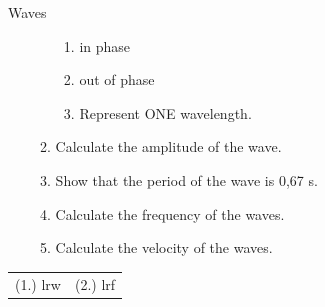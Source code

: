 \begin{eocexercises}{Waves}
\begin{enumerate}[noitemsep, label=\textbf{\arabic*}. ]
\begin{enumerate}[noitemsep, label=\textbf{\alph*}. ]
\label{m38806*uid0821323}\begin{enumerate}[noitemsep, label=\textbf{\roman*}. ] 
            \item in phase\item out of phase\item Represent ONE wavelength.\end{enumerate}
        \item Calculate the amplitude of the wave.\item Show that the period of the wave is 0,67 s.\item Calculate the frequency of the waves.\item Calculate the velocity of the waves.\end{enumerate}
         \end{enumerate}
  \label{m38806**end}
\par \practiceinfo
 \par \begin{tabular}[h]{cc}
(1.) lrw  &  (2.) lrf  & \end{tabular}

\end{eocexercises}
